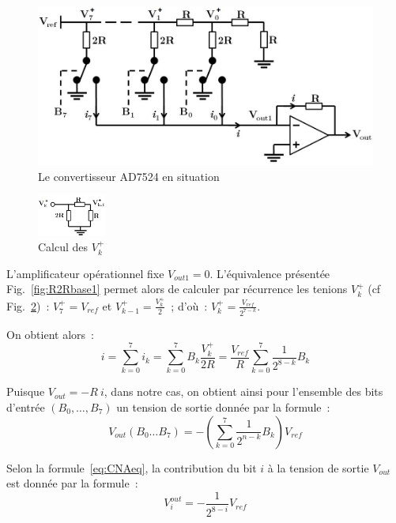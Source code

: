 \documentclass{article}
\begin{document}
\begin{figure}[h]
  \centering
  \includegraphics[width=.6\textwidth]{AD7524}
  \caption{Le convertisseur AD7524 en situation}
  \label{fig:AD7524}
\end{figure}

\begin{figure}
  \begin{center}
    \includegraphics[width=0.2\textwidth]{AD7524eq}
  \end{center}
  \caption{Calcul des $V_k^+$}
  \label{fig:AD7524eq}
\end{figure}

L'amplificateur opérationnel fixe $V_{out1}=0$. L'équivalence présentée Fig.~\ref{fig:R2Rbase1} permet alors de calculer par récurrence les tenions $V_k^+$ (cf Fig.~\ref{fig:AD7524eq})~: $V_7^+ = V_{ref}$ et $V_{k-1}^+=\frac{V_k^+}{2}$~; d'où~: ${V_k^+=\frac{V_{ref}}{2^{7-k}}}$.

On obtient alors~:
\begin{equation*}
i = \sum_{k=0}^7 i_k = \sum_{k=0}^7 B_k \frac{V_k^+}{2R} = \frac{V_{ref}}{R} \sum_{k=0}^7 \frac{1}{2^{8-k}} B_k
\end{equation*}


Puisque $V_{out} = -R~i$, dans notre cas, on obtient ainsi pour l'ensemble des bits d'entrée $(B_0,\dots,B_7)$ un tension de sortie donnée par la formule~:
\begin{equation}
V_{out}(B_0\dots B_7) = -\left(\sum_{k=0}^{7}\frac{1}{2^{n-k}}B_k\right)V_{ref}
\label{eq:CNAeq}
\end{equation}


Selon la formule~\ref{eq:CNAeq}, la contribution du bit $i$ à la tension de sortie $V_{out}$ est donnée par la formule~:
\begin{equation*}
V_i^{out} = -\frac{1}{2^{8-i}}V_{ref}
\end{equation*}
\end{document}

